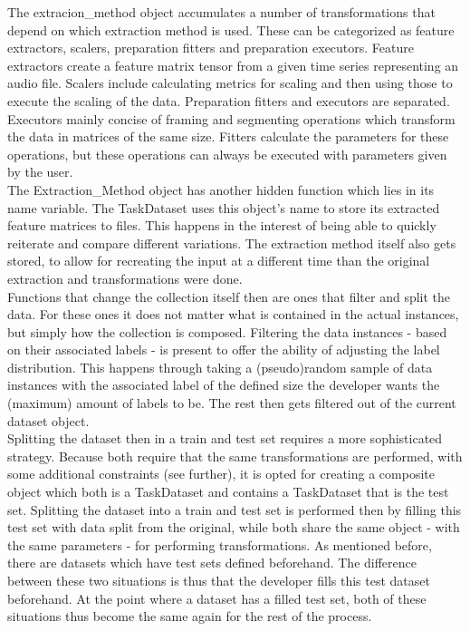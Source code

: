 The extracion\_method object accumulates a number of transformations that depend on which extraction method is used. These can be categorized as feature extractors, scalers, preparation fitters and preparation executors. Feature extractors create a feature matrix tensor from a given time series representing an audio file. Scalers include calculating metrics for scaling and then using those to execute the scaling of the data. Preparation fitters and executors are separated. Executors mainly concise of framing and segmenting operations which transform the data in matrices of the same size. Fitters calculate the parameters for these operations, but these operations can always be executed with parameters given by the user.\\

The Extraction\_Method object has another hidden function which lies in its name variable. The TaskDataset uses this object's name to store its extracted feature matrices to files. This happens in the interest of being able to quickly reiterate and compare different variations. The extraction method itself also gets stored, to allow for recreating the input at a different time than the original extraction and transformations were done.\\

Functions that change the collection itself then are ones that filter and split the data. For these ones it does not matter what is contained in the actual instances, but simply how the collection is composed. Filtering the data instances - based on their associated labels - is present to offer the ability of adjusting the label distribution. This happens through taking a (pseudo)random sample of data instances with the associated label of the defined size the developer wants the (maximum) amount of labels to be. The rest then gets filtered out of the current dataset object. \\

Splitting the dataset then in a train and test set requires a more sophisticated strategy. Because both require that the same transformations are performed, with some additional constraints (see further), it is opted for creating a composite object which both is a TaskDataset and contains a TaskDataset that is the test set. Splitting the dataset into a train and test set is performed then by filling this test set with data split from the original, while both share the same object - with the same parameters - for performing transformations. As mentioned before, there are datasets which have test sets defined beforehand. The difference between these two situations is thus that the developer fills this test dataset beforehand. At the point where a dataset has a filled test set, both of these situations thus become the same again for the rest of the process. \\

